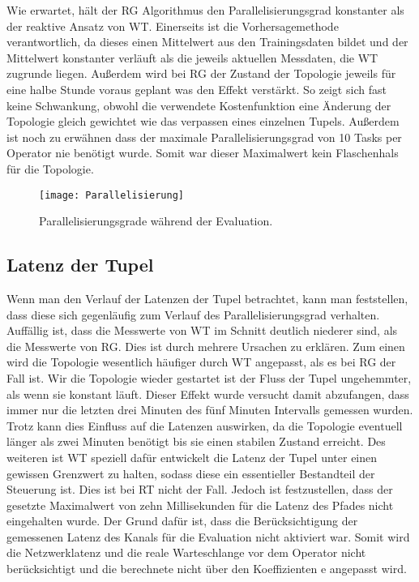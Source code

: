 Wie erwartet, hält der RG Algorithmus den Parallelisierungsgrad konstanter als der reaktive Ansatz von WT.
Einerseits ist die Vorhersagemethode verantwortlich, da dieses einen Mittelwert aus den Trainingsdaten bildet und der Mittelwert konstanter verläuft als die jeweils aktuellen Messdaten, die WT zugrunde liegen.
Außerdem wird bei RG der Zustand der Topologie jeweils für eine halbe Stunde voraus geplant was den Effekt verstärkt.
So zeigt sich fast keine Schwankung, obwohl die verwendete Kostenfunktion eine Änderung der Topologie gleich gewichtet wie das verpassen eines einzelnen Tupels.
Außerdem ist noch zu erwähnen dass der maximale Parallelisierungsgrad von 10 Tasks per Operator nie benötigt wurde.
Somit war dieser Maximalwert kein Flaschenhals für die Topologie.

\begin{figure}
\texttt{[image: Parallelisierung]}
\caption{Parallelisierungsgrade während der Evaluation.}
\end{figure}

\subsection{Latenz der Tupel}

Wenn man den Verlauf der Latenzen der Tupel betrachtet, kann man feststellen, dass diese sich gegenläufig zum Verlauf des Parallelisierungsgrad verhalten.
Auffällig ist, dass die Messwerte von WT im Schnitt deutlich niederer sind, als die Messwerte von RG.
Dies ist durch mehrere Ursachen zu erklären.
Zum einen wird die Topologie wesentlich häufiger durch WT angepasst, als es bei RG der Fall ist.
Wir die Topologie wieder gestartet ist der Fluss der Tupel ungehemmter, als wenn sie konstant läuft.
Dieser Effekt wurde versucht damit abzufangen, dass immer nur die letzten drei Minuten des fünf Minuten Intervalls gemessen wurden.
Trotz kann dies Einfluss auf die Latenzen auswirken, da die Topologie eventuell länger als zwei Minuten benötigt bis sie einen stabilen Zustand erreicht.
Des weiteren ist WT speziell dafür entwickelt die Latenz der Tupel unter einen gewissen Grenzwert zu halten, sodass diese ein essentieller Bestandteil der Steuerung ist.
Dies ist bei RT nicht der Fall.
Jedoch ist festzustellen, dass der gesetzte Maximalwert von zehn Millisekunden für die Latenz des Pfades nicht eingehalten wurde.
Der Grund dafür ist, dass die Berücksichtigung der gemessenen Latenz des Kanals für die Evaluation nicht aktiviert war.
Somit wird die Netzwerklatenz und die reale Warteschlange vor dem Operator nicht berücksichtigt und die berechnete nicht über den Koeffizienten e angepasst wird.

